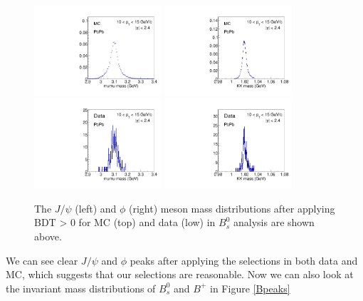 \begin{figure}[h]
\begin{center}
\includegraphics[width=0.42\textwidth]{Figures/Chapter5/mc_PbPb_1_Bmumumass.pdf}
\includegraphics[width=0.42\textwidth]{Figures/Chapter5/mc_PbPb_1_Btktkmass.pdf}
\includegraphics[width=0.42\textwidth]{Figures/Chapter5/data_PbPb_1_Bmumumass.pdf}
\includegraphics[width=0.42\textwidth]{Figures/Chapter5/data_PbPb_1_Btktkmass.pdf}
\caption{The $J/\psi$ (left) and $\phi$ (right) meson mass distributions after applying BDT > 0 for MC (top) and data (low) in $B^0_s$ analysis are shown above.}
\label{mesonpeak}
\end{center}
\end{figure}

We can see clear $J/\psi$ and $\phi$ peaks after applying the selections in both data and MC, which suggests that our selections are reasonable. Now we can also look at the invariant mass distributions of $B^0_s$ and $B^+$ in Figure \ref{Bpeaks}

